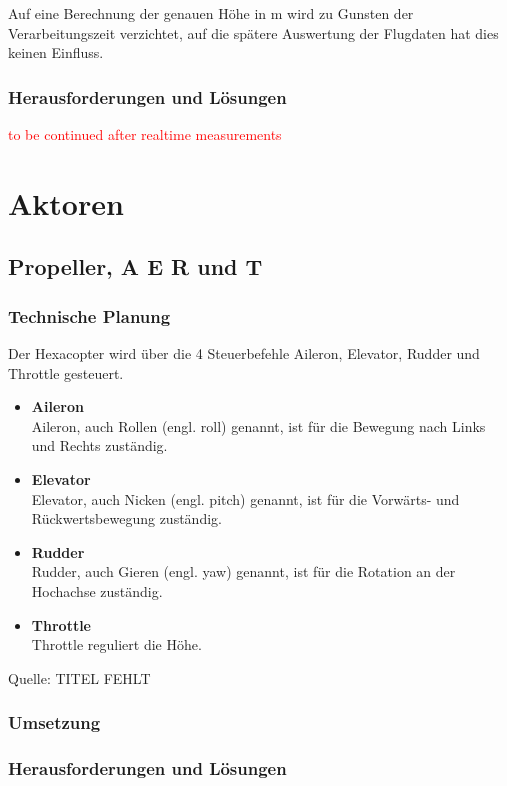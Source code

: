   Auf eine Berechnung der genauen Höhe in m wird zu Gunsten der Verarbeitungszeit verzichtet, auf die spätere Auswertung der Flugdaten hat dies keinen Einfluss.

  \subsection{Herausforderungen und Lösungen}
  \textcolor{red}{to be continued after realtime measurements}

\chapter{Aktoren}
\renewcommand{\kapitelautor}{Autor: Lucas Ullrich}

\section{Propeller, A E R und T}


  \subsection{Technische Planung}
    Der Hexacopter wird über die 4 Steuerbefehle Aileron, Elevator, Rudder und Throttle gesteuert.

    \begin{itemize}
      \item \textbf{Aileron}\\
      Aileron, auch Rollen (engl. roll) genannt, ist für die Bewegung nach Links und Rechts zuständig.

      \item \textbf{Elevator}\\
      Elevator, auch Nicken (engl. pitch) genannt, ist für die Vorwärts- und Rückwertsbewegung zuständig.

      \item \textbf{Rudder}\\
      Rudder, auch Gieren (engl. yaw) genannt, ist für die Rotation an der Hochachse zuständig.

      \item \textbf{Throttle}\\
      Throttle reguliert die Höhe.

    \end{itemize}

    Quelle: TITEL FEHLT \cite{GrundlagenMulticopter}

  \subsection{Umsetzung}

  \subsection{Herausforderungen und Lösungen}
